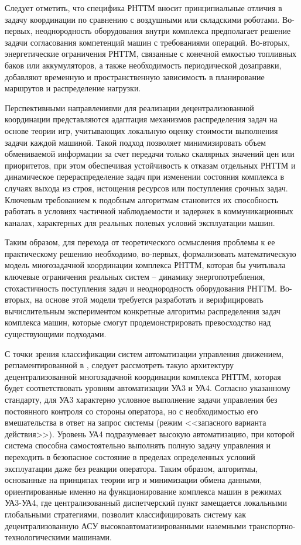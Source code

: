 Следует отметить, что специфика РНТТМ вносит принципиальные отличия в задачу координации по сравнению с воздушными или складскими роботами. Во-первых, неоднородность оборудования внутри комплекса предполагает решение задачи согласования компетенций машин с требованиями операций. Во-вторых, энергетические ограничения РНТТМ, связанные с конечной емкостью топливных баков или аккумуляторов, а также необходимость периодической дозаправки, добавляют временную и пространственную зависимость в планирование маршрутов и распределение нагрузки.

Перспективными направлениями для реализации децентрализованной координации представляются адаптация механизмов распределения задач на основе теории игр, учитывающих локальную оценку стоимости выполнения задачи каждой машиной. Такой подход позволяет минимизировать объем обмениваемой информации за счет передачи только скалярных значений цен или приоритетов, при этом обеспечивая устойчивость к отказам отдельных РНТТМ и динамическое перераспределение задач при изменении состояния комплекса в случаях выхода из строя, истощения ресурсов или поступления срочных задач. Ключевым требованием к подобным алгоритмам становится их способность работать в условиях частичной наблюдаемости и задержек в коммуникационных каналах, характерных для реальных полевых условий эксплуатации машин.

Таким образом, для перехода от теоретического осмысления проблемы к ее практическому решению необходимо, во-первых, формализовать математическую модель многозадачной координации комплекса РНТТМ, которая бы учитывала ключевые ограничения реальных систем -- динамику энергопотребления, стохастичность поступления задач и неоднородность оборудования РНТТМ. Во-вторых, на основе этой модели требуется разработать и верифицировать вычислительным экспериментом конкретные алгоритмы распределения задач комплекса машин, которые смогут продемонстрировать превосходство над существующими подходами.

С точки зрения классификации систем автоматизации управления движением, регламентированной в \cite{gostR58823, gostR59483}, следует рассмотреть такую архитектуру децентрализованной многозадачной координации комплекса РНТТМ, которая будет соответствовать уровням автоматизации УА3 и УА4. Согласно указанному стандарту, для УА3 характерно условное выполнение задачи управления без постоянного контроля со стороны оператора, но с необходимостью его вмешательства в ответ на запрос системы (режим <<запасного варианта действия>>). Уровень УА4 подразумевает высокую автоматизацию, при которой система способна самостоятельно выполнять полную задачу управления и переходить в безопасное состояние в пределах определенных условий эксплуатации даже без реакции оператора. Таким образом, алгоритмы, основанные на принципах теории игр и минимизации обмена данными, ориентированные именно на функционирование комплекса машин в режимах УА3-УА4, где централизованный диспетчерский пункт замещается локальными глобальными стратегиями, позволит классифицировать систему как децентрализованную АСУ высокоавтоматизированными наземными транспортно-технологическими машинами.



\FloatBarrier

